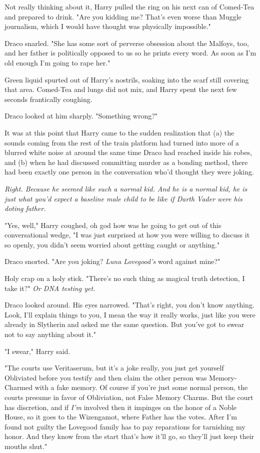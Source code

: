 Not really thinking about it, Harry pulled the ring on his next can of
Comed-Tea and prepared to drink. "Are you kidding me? That's even worse than
Muggle journalism, which I would have thought was physically impossible."

Draco snarled. "She has some sort of perverse obsession about the Malfoys, too,
and her father is politically opposed to us so he prints every word. As soon as
I'm old enough I'm going to rape her."

Green liquid spurted out of Harry's nostrils, soaking into the scarf still
covering that area. Comed-Tea and lungs did not mix, and Harry spent the next
few seconds frantically coughing.

Draco looked at him sharply. "Something wrong?"

It was at this point that Harry came to the sudden realization that (a) the
sounds coming from the rest of the train platform had turned into more of a
blurred white noise at around the same time Draco had reached inside his robes,
and (b) when he had discussed committing murder as a bonding method, there had
been exactly one person in the conversation who'd thought they were joking.

\emph{Right. Because he seemed like such a normal kid. And he is
a normal kid, he is just what you'd expect a baseline male child to be
like if Darth Vader were his doting father.}

"Yes, well," Harry coughed, oh god how was he going to get out of this
conversational wedge, "I was just surprised at how you were willing to discuss
it so openly, you didn't seem worried about getting caught or anything."

Draco snorted. "Are you joking? \emph{Luna Lovegood's} word against mine?"

Holy crap on a holy stick. "There's no such thing as magical truth detection, I
take it?" \emph{Or DNA testing{\el} yet.}

Draco looked around. His eyes narrowed. "That's right, you don't know anything.
Look, I'll explain things to you, I mean the way it really works, just like you
were already in Slytherin and asked me the same question. But you've got to
swear not to say anything about it."

"I swear," Harry said.

"The courts use Veritaserum, but it's a joke really, you just get yourself
Obliviated before you testify and then claim the other person was
Memory-Charmed with a fake memory. Of course if you're just some normal person,
the courts presume in favor of Obliviation, not False Memory Charms. But the
court has discretion, and if \emph{I'm} involved then it impinges on the honor
of a Noble House, so it goes to the Wizengamot, where Father has the votes.
After I'm found not guilty the Lovegood family has to pay reparations for
tarnishing my honor. And they know from the start that's how it'll go, so
they'll just keep their mouths shut."

